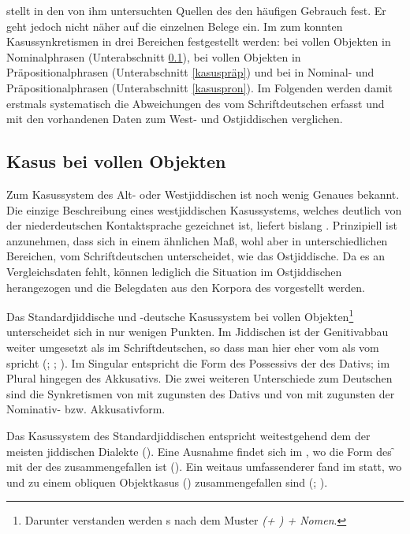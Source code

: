 \cite[102]{Richter1995} stellt in den von ihm untersuchten Quellen des \hai{{\LiJi}} den häufigen Gebrauch  fest. Er geht jedoch nicht näher auf die einzelnen Belege ein. Im  zum  konnten Kasussynkretismen in drei Bereichen festgestellt werden: bei vollen Objekten in Nominalphrasen (Unterabschnitt \ref{kasusobj}), bei vollen Objekten in Präpositionalphrasen (Unterabschnitt \ref{kasuspräp}) und bei  in Nominal- und Präpositionalphrasen (Unterabschnitt \ref{kasuspron}). Im Folgenden werden damit erstmals systematisch die Abweichungen des \hai{{\LiJi}} vom Schriftdeutschen erfasst und mit den vorhandenen Daten zum West- und Ostjiddischen verglichen.

 \subsection{Kasus bei vollen Objekten}\label{kasusobj}

Zum Kasussystem des Alt- oder Westjiddischen ist noch wenig Genaues bekannt. Die einzige Beschreibung eines westjiddischen Kasussystems, welches deutlich von der niederdeutschen Kontaktsprache gezeichnet ist, liefert bislang \citet[61–66]{Reershemius2007}. Prinzipiell ist anzunehmen, dass sich   in einem ähnlichen Maß, wohl aber in unterschiedlichen Bereichen, vom Schriftdeutschen unterscheidet, wie das Ostjiddische. Da es an Vergleichsdaten fehlt, können lediglich die Situation im Ostjiddischen herangezogen  und die Belegdaten  aus den Korpora des \hai{{\LiJi}} vorgestellt werden. 

 Das Standardjiddische  und -deutsche Kasussystem bei vollen Objekten\footnote{Darunter verstanden werden \hai{{\NP}}s nach dem Muster \textit{ (+ ) + Nomen}.} unterscheidet sich in nur wenigen Punkten. Im Jiddischen ist der Genitivabbau weiter umgesetzt als im Schriftdeutschen, so dass man hier eher vom  als vom  spricht (\citealt[110f]{Wolf1969}; \citealt[172]{Jacobs2005}; \citealt[403f]{Jacobsetal2013}). Im Singular entspricht die Form des Possessivs der des Dativs; im Plural hingegen des Akkusativs. Die zwei weiteren Unterschiede zum Deutschen sind die Synkretismen von {\Akk} {\Sg} {\mask} mit {\Dat} {\Sg} {\mask} zugunsten des Dativs und von {\Dat} {\Pl} mit {\Akk} {\Pl} zugunsten der Nominativ- bzw. Akkusativform. 
 
Das Kasussystem des Standardjiddischen entspricht weitestgehend dem der meisten jiddischen Dialekte (\citealt[129]{Wolf1969}). Eine Ausnahme findet sich im , wo die Form des {\Dat} {\f} mit der des {\Akk} zusammengefallen ist (\citealt[129]{Wolf1969}). Ein weitaus umfassenderer  fand im \hai{{\NOJ}} statt, wo  und  zu einem obliquen Objektkasus () zusammengefallen sind (\citealt[160]{Zaretski1929}; \citealt[117]{Wolf1969}).\label{FNKASUSDIALEKT} \\
 

